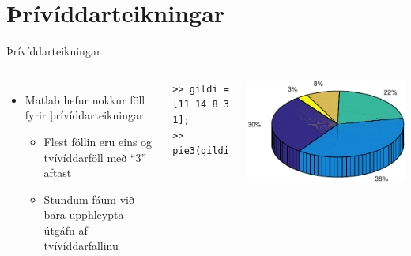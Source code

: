 \documentclass{beamer}
\begin{document}
\section{Þrívíddarteikningar}

\begin{frame}[fragile]{Þrívíddarteikningar}
\begin{columns}
\begin{itemize}
 \item Matlab hefur nokkur föll fyrir þrívíddarteikningar
 \begin{itemize}
  \item Flest föllin eru eins og tvívíddarföll með ``3'' aftast
  \item Stundum fáum við bara upphleypta útgáfu af tvívíddarfallinu
 \end{itemize}
\end{itemize}
\begin{verbatim}
>> gildi = [11 14 8 3 1];
>> pie3(gildi)
\end{verbatim}

\includegraphics[width=\linewidth]{../Pics/3dpie}
\end{columns}
\end{frame}
\end{document}
